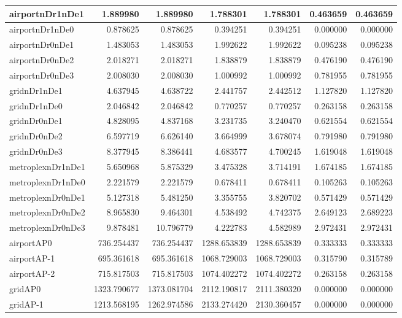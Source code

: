 \documentclass[../../../thesis.tex]{subfiles}
\begin{document}
\begin{longtable}{|l|r|r|r|r|r|r|}
\endlastfoot
airportnDr1nDe1 & 1.889980 & 1.889980 & 1.788301 & 1.788301 & 0.463659 & 0.463659 \\ \hline
airportnDr1nDe0 & 0.878625 & 0.878625 & 0.394251 & 0.394251 & 0.000000 & 0.000000 \\ \hline
airportnDr0nDe1 & 1.483053 & 1.483053 & 1.992622 & 1.992622 & 0.095238 & 0.095238 \\ \hline
airportnDr0nDe2 & 2.018271 & 2.018271 & 1.838879 & 1.838879 & 0.476190 & 0.476190 \\ \hline
airportnDr0nDe3 & 2.008030 & 2.008030 & 1.000992 & 1.000992 & 0.781955 & 0.781955 \\ \hline
gridnDr1nDe1 & 4.637945 & 4.638722 & 2.441757 & 2.442512 & 1.127820 & 1.127820 \\ \hline
gridnDr1nDe0 & 2.046842 & 2.046842 & 0.770257 & 0.770257 & 0.263158 & 0.263158 \\ \hline
gridnDr0nDe1 & 4.828095 & 4.837168 & 3.231735 & 3.240470 & 0.621554 & 0.621554 \\ \hline
gridnDr0nDe2 & 6.597719 & 6.626140 & 3.664999 & 3.678074 & 0.791980 & 0.791980 \\ \hline
gridnDr0nDe3 & 8.377945 & 8.386441 & 4.683577 & 4.700245 & 1.619048 & 1.619048 \\ \hline
metroplexnDr1nDe1 & 5.650968 & 5.875329 & 3.475328 & 3.714191 & 1.674185 & 1.674185 \\ \hline
metroplexnDr1nDe0 & 2.221579 & 2.221579 & 0.678411 & 0.678411 & 0.105263 & 0.105263 \\ \hline
metroplexnDr0nDe1 & 5.127318 & 5.481250 & 3.355755 & 3.820702 & 0.571429 & 0.571429 \\ \hline
metroplexnDr0nDe2 & 8.965830 & 9.464301 & 4.538492 & 4.742375 & 2.649123 & 2.689223 \\ \hline
metroplexnDr0nDe3 & 9.878481 & 10.796779 & 4.222783 & 4.582989 & 2.972431 & 2.972431 \\ \hline
airportAP0 & 736.254437 & 736.254437 & 1288.653839 & 1288.653839 & 0.333333 & 0.333333 \\ \hline
airportAP-1 & 695.361618 & 695.361618 & 1068.729003 & 1068.729003 & 0.315790 & 0.315789 \\ \hline
airportAP-2 & 715.817503 & 715.817503 & 1074.402272 & 1074.402272 & 0.263158 & 0.263158 \\ \hline
gridAP0 & 1323.790677 & 1373.081704 & 2112.190817 & 2111.380320 & 0.000000 & 0.000000 \\ \hline
gridAP-1 & 1213.568195 & 1262.974586 & 2133.274420 & 2130.360457 & 0.000000 & 0.000000 \\ \hline

\end{longtable}
\end{document}
